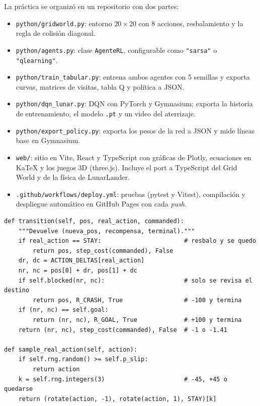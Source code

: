 \documentclass[11pt]{article}
\begin{document}
La práctica se organizó en un repositorio con dos partes:
\begin{itemize}
    \item \texttt{python/gridworld.py}: entorno $20 \times 20$ con 8 acciones,
    resbalamiento y la regla de colisión diagonal.
    \item \texttt{python/agents.py}: clase \texttt{AgenteRL}, configurable como
    \texttt{"sarsa"} o \texttt{"qlearning"}.
    \item \texttt{python/train\_tabular.py}: entrena ambos agentes con 5 semillas y
    exporta curvas, matrices de visitas, tabla Q y política a JSON.
    \item \texttt{python/dqn\_lunar.py}: DQN con PyTorch y Gymnasium; exporta la
    historia de entrenamiento, el modelo \texttt{.pt} y un video del aterrizaje.
    \item \texttt{python/export\_policy.py}: exporta los pesos de la red a JSON y
    mide líneas base en Gymnasium.
    \item \texttt{web/}: sitio en Vite, React y TypeScript con gráficas de Plotly,
    ecuaciones en KaTeX y los juegos 3D (three.js). Incluye el port a
    TypeScript del Grid World y de la física de LunarLander.
    \item \texttt{.github/workflows/deploy.yml}: pruebas (pytest y Vitest),
    compilación y despliegue automático en GitHub Pages con cada \emph{push}.
\end{itemize}

\begin{lstlisting}[style=py, caption={Transición del Grid World con la regla de colisión (extracto de \texttt{gridworld.py}).}]
def transition(self, pos, real_action, commanded):
    """Devuelve (nueva_pos, recompensa, terminal)."""
    if real_action == STAY:                       # resbalo y se quedo
        return pos, step_cost(commanded), False
    dr, dc = ACTION_DELTAS[real_action]
    nr, nc = pos[0] + dr, pos[1] + dc
    if self.blocked(nr, nc):                      # solo se revisa el destino
        return pos, R_CRASH, True                 # -100 y termina
    if (nr, nc) == self.goal:
        return (nr, nc), R_GOAL, True             # +100 y termina
    return (nr, nc), step_cost(commanded), False  # -1 o -1.41

def sample_real_action(self, action):
    if self.rng.random() >= self.p_slip:
        return action
    k = self.rng.integers(3)                      # -45, +45 o quedarse
    return (rotate(action, -1), rotate(action, 1), STAY)[k]
\end{lstlisting}
\end{document}
